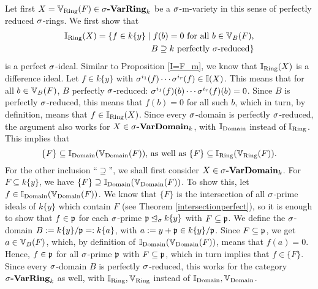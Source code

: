 \begin{prop}
\begin{bew}
Let first $X  = \mathbb{V}_{\operatorname{Ring}}(F) \in \sigma\text{{\normalfont\textbf{-VarRing}}}_k$ be a $\sigma$-m-variety in this sense of perfectly reduced $\sigma$-rings. 
We first show that \begin{align*} \mathbb{I}_{\operatorname{Ring}}(X) =  \{ f \in k\{y\} \mid f(b) = 0 \text{ for all } b \in \mathbb{V}_B(F), \\ B \supseteq k\text{ perfectly }\sigma\text{-reduced} \} \end{align*}
 is a perfect $\sigma$-ideal. Similar to Proposition \ref{I=F_m}, we know that $\mathbb{I}_{\operatorname{Ring}}(X)$ is a difference ideal. Let $f \in k\{y\}$ with $\sigma^{i_1}(f) \cdots \sigma^{i_r}(f) \in \mathbb{I}(X)$. This means that for all $b \in \mathbb{V}_B(F)$,
 $B$ perfectly $\sigma$-reduced: $\sigma^{i_1}(f)(b) \cdots \sigma^{i_r}(f)(b) = 0$. Since $B$ is perfectly $\sigma$-reduced, this means that $f(b) = 0$ for all such $b$,
 which in turn, by definition, means that $f \in \mathbb{I}_{\operatorname{Ring}}(X)$. Since every $\sigma$-domain is perfectly $\sigma$-reduced, the argument also works for $X \in \sigma\text{{\normalfont\textbf{-VarDomain}}}_k$, with $\mathbb{I}_{\operatorname{Domain}}$ instead of $\mathbb{I}_{\operatorname{Ring}}$.
This implies that $$ \{ F \} \subseteq \mathbb{I}_{\operatorname{Domain}}(\mathbb{V}_{\operatorname{Domain}}(F))\text{, as well as } \{ F \} \subseteq \mathbb{I}_{\operatorname{Ring}}(\mathbb{V}_{\operatorname{Ring}}(F)).$$
For the other inclusion ``$\supseteq$'', we shall first consider $X \in \sigma\text{{\normalfont\textbf{-VarDomain}}}_k$.
For $F \subseteq k\{y\}$, we have $\{F\} \supseteq \mathbb{I}_{\operatorname{Domain}}(\mathbb{V}_{\operatorname{Domain}}(F))$. To show this, let \\ $f \in \mathbb{I}_{\operatorname{Domain}}(\mathbb{V}_{\operatorname{Domain}}(F))$.
We know that $\{F\}$ is the intersection of all $\sigma$-prime ideals of $k\{y\}$ which contain $F$ (see Theorem \ref{intersectionperfect}), so it is enough to show that $f \in \mathfrak{p}$ for each $\sigma$-prime $\mathfrak{p} \unlhd_{\sigma} k\{y\}$ with $F \subseteq \mathfrak{p}$.
We define the $\sigma$-domain $B:= k\{y\}/\mathfrak{p} =: k\{a\}$, with $a := y + \mathfrak{p} \in k\{y\}/\mathfrak{p}$. Since $F \subseteq \mathfrak{p}$, we get $a \in \mathbb{V}_B(F)$, which, by definition of $\mathbb{I}_{\operatorname{Domain}}(\mathbb{V}_{\operatorname{Domain}}(F))$, means that $f(a) = 0$. Hence, $f \in \mathfrak{p}$ for all $\sigma$-prime $\mathfrak{p}$
with $F \subseteq \mathfrak{p}$, which in turn implies that $f \in \{F\}$. Since every $\sigma$-domain $B$ is perfectly $\sigma$-reduced, this works for the category $\sigma\text{{\normalfont\textbf{-VarRing}}}_k$ as well, with $\mathbb{I}_{\operatorname{Ring}}, \mathbb{V}_{\operatorname{Ring}}$ instead of $\mathbb{I}_{\operatorname{Domain}}, \mathbb{V}_{\operatorname{Domain}}$.
\end{bew}

\end{prop}

